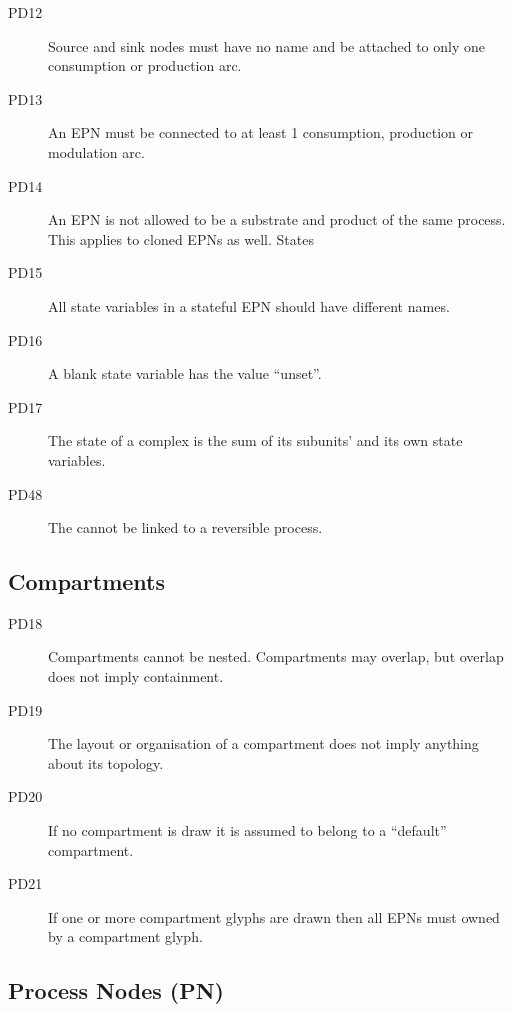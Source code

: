 \begin{description}
\item[PD12] Source and sink nodes must have no name and be attached to only one consumption or production arc.
\item[PD13] An EPN must be connected to at least 1 consumption, production or modulation arc.
\item[PD14] An EPN is not allowed to be a substrate and product of the same process. This applies to cloned EPNs as well.
States
\item[PD15] All state variables in a stateful EPN should have different names.
\item[PD16] A blank state variable has the value “unset”.
\item[PD17] The state of a complex is the sum of its subunits’ and its own state variables.
\item[PD48] The  cannot be linked to a reversible process.
\end{description}

\subsection{Compartments}

\begin{description}
\item[PD18] Compartments cannot be nested. Compartments may overlap, but overlap does not imply containment.
\item[PD19] The layout or organisation of a compartment does not imply anything about its topology.
\item[PD20] If no compartment is draw it is assumed to belong to a “default” compartment.
\item[PD21] If one or more compartment glyphs are drawn then all EPNs must owned by a compartment glyph.
\end{description}

\subsection{Process Nodes (PN)}

